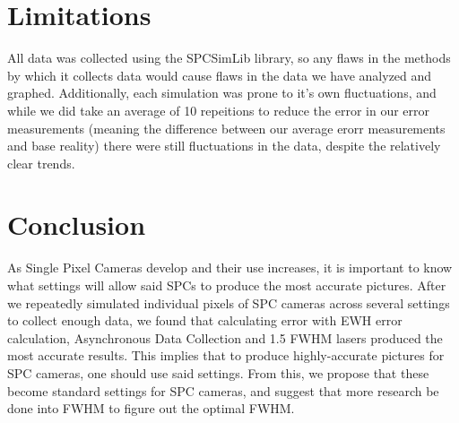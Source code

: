 \documentclass{article}
\begin{document}
\section*{Limitations}
All data was collected using the SPCSimLib library, so any flaws in the methods by which it collects data would cause flaws in the data we have analyzed and graphed. Additionally, each simulation was prone to it's own fluctuations, and while we did take an average of 10 repeitions to reduce the error in our error measurements (meaning the difference between our average erorr measurements and base reality) there were still fluctuations in the data, despite the relatively clear trends.

\section*{Conclusion}
As Single Pixel Cameras develop and their use increases, it is important to know what settings will allow said SPCs to produce the most accurate pictures. After we repeatedly simulated  individual pixels of SPC cameras across several settings to collect enough data, we found that calculating error with EWH error calculation, Asynchronous Data Collection and 1.5 FWHM lasers produced the most accurate results. This implies that to produce highly-accurate pictures for SPC cameras, one should use said settings. From this, we propose that these become standard settings for SPC cameras, and suggest that more research be done into FWHM to figure out the optimal FWHM.

\printbibliography
\end{document}

